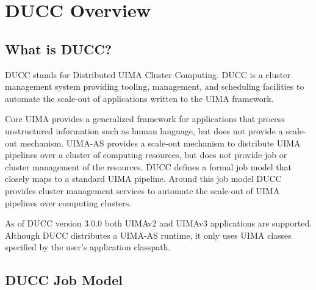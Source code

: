 % 
% 
% 
% 
\ifpdf
\else
{}
\fi
\chapter{DUCC Overview}

    \section{What is DUCC?}

    DUCC stands for Distributed UIMA Cluster Computing. DUCC is a cluster management system
    providing tooling, management, and scheduling facilities to automate the scale-out of
    applications written to the UIMA framework.

    Core UIMA provides a generalized framework for applications that process unstructured
    information such as human language, but does not provide a scale-out mechanism. UIMA-AS provides
    a scale-out mechanism to distribute UIMA pipelines over a cluster of computing resources, but
    does not provide job or cluster management of the resources. DUCC defines a formal job model
    that closely maps to a standard UIMA pipeline. Around this job model DUCC provides cluster
    management services to automate the scale-out of UIMA pipelines over computing clusters.
    
    As of DUCC version 3.0.0 both UIMAv2 and UIMAv3 applications are supported. Although DUCC 
    distributes a UIMA-AS runtime, it only uses UIMA classes specified by the user's application 
    classpath.    
     

    \section{DUCC Job Model}

